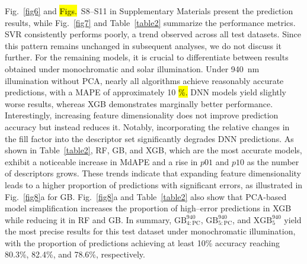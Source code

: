 \documentclass[a4paper,fleqn,draft]{cas-sc}
\begin{document}
Fig.~\ref{fig6} and \textcolor[rgb]{1.00,0.07,0.00}{
\hl{Figs.}}~S8--S11 in Supplementary Materials present the prediction results,
while Fig.~\ref{fig7} and Table~\ref{table2} summarize the performance metrics.
SVR consistently performs poorly, a trend observed across all test datasets.
Since this pattern remains unchanged in subsequent analyses, we do not discuss it further.
For the remaining models, it is crucial to differentiate between results obtained under monochromatic and solar illumination.
Under 940~nm illumination without PCA, nearly all algorithms achieve reasonably accurate predictions, with a MAPE of approximately 10\textcolor[rgb]{1.00,0.07,0.00}{
\hl{\%.}}
DNN models yield slightly worse results, whereas XGB demonstrates marginally better performance.
Interestingly, increasing feature dimensionality does not improve prediction accuracy but instead reduces it.
Notably, incorporating the relative changes in the fill factor into the descriptor set significantly degrades DNN predictions.
As shown in Table~\ref{table2}, RF, GB, and XGB, which are the most accurate models, exhibit a noticeable increase
in MdAPE and a rise in $p01$ and $p10$ as the number of descriptors grows.
These trends indicate that expanding feature dimensionality leads to a higher proportion of predictions with significant errors,
as illustrated in Fig.~\ref{fig8}a for GB.
Fig.~\ref{fig8}a and Table~\ref{table2} also show that PCA-based model simplification increases the proportion of high--error predictions
in XGB while reducing it in RF and GB.
In summary, $\mathrm{GB}^{940}_\mathrm{4:PC}$, $\mathrm{GB}^{940}_\mathrm{5:PC}$,
and $\mathrm{XGB}^{940}_5$ yield the most precise results for this test dataset under monochromatic illumination,
with the proportion of predictions achieving at least 10\% accuracy reaching 80.3\%, 82.4\%, and 78.6\%, respectively.
\end{document}

